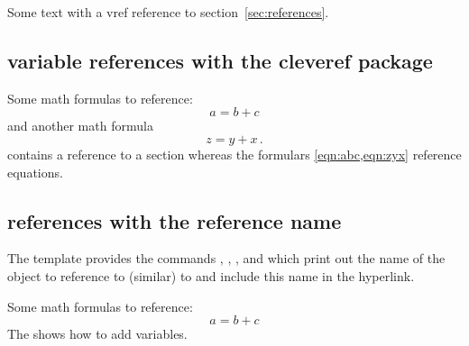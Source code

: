 \begin{filecontents*}{\democodefile}
Some text with a vref reference 
to section~\vref{sec:references}.
\end{filecontents*}

%

\subsection{variable references with the cleveref package}

\begin{filecontents*}{\democodefile}
Some math formulas to reference:
\begin{equation}
a = b + c \label{eqn:abc}
\end{equation}
and another math formula
\begin{equation}
z = y + x\,. \label{eqn:zyx}
\end{equation}
 contains a reference to a section
whereas the formulars \cref{eqn:abc,eqn:zyx} 
reference equations.
\end{filecontents*}

%
\subsection{references with the reference name}

The template provides the commands , , ,  and  which print out the name of the object to reference to (similar) to  and include this name in the hyperlink.

\begin{filecontents*}{\democodefile}
Some math formulas to reference:
\begin{equation}
a = b + c \label{eqn:abc}
\end{equation}
%
The  shows how to add variables.
\end{filecontents*}

